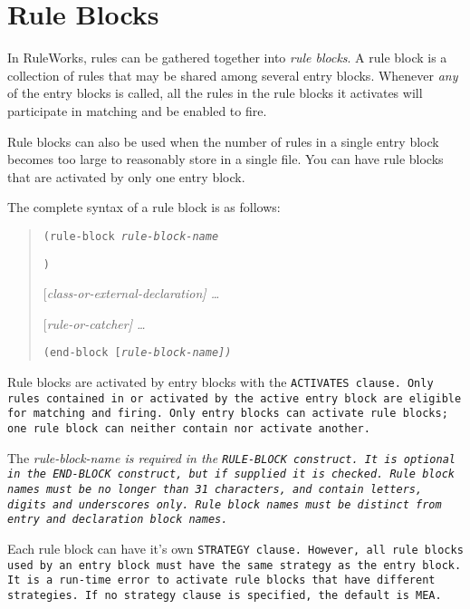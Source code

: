 \section{Rule Blocks}

In RuleWorks, rules can be gathered together into \emph{rule
  blocks}. A rule block is a collection of rules that may be shared
among several entry blocks. Whenever \emph{any} of the entry blocks is
called, all the rules in the rule blocks it activates will participate
in matching and be enabled to fire.

Rule blocks can also be used when the number of rules in a single
entry block becomes too large to reasonably store in a single file.
You can have rule blocks that are activated by only one entry block.

The complete syntax of a rule block is as follows:

\begin{quote}
  \tt{(rule-block} \it{rule-block-name}
  

\tt{)}

[\it{class-or-external-declaration}] \ldots

[\it{rule-or-catcher}] \ldots

\tt{(end-block} [\it{rule-block-name}]\tt{)}
\end{quote}

Rule blocks are activated by entry blocks with the \tt{ACTIVATES}
clause. Only rules contained in or activated by the active entry block
are eligible for matching and firing. Only entry blocks can activate
rule blocks; one rule block can neither contain nor activate another.

The \it{rule-block-name} is required in the \tt{RULE-BLOCK}
construct. It is optional in the \tt{END-BLOCK} construct, but if
supplied it is checked. Rule block names must be no longer than 31
characters, and contain letters, digits and underscores only. Rule
block names must be distinct from entry and declaration block names.

Each rule block can have it's own \tt{STRATEGY} clause. However, all
rule blocks used by an entry block must have the same strategy as the
entry block. It is a run-time error to activate rule blocks that have
different strategies. If no strategy clause is specified, the default
is \tt{MEA}.

